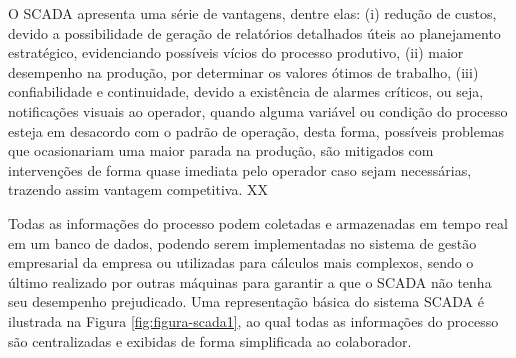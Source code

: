         O \gls{SCADA} apresenta uma série de vantagens, dentre elas: (i) redução de custos, devido a possibilidade de geração de relatórios detalhados úteis ao planejamento estratégico, evidenciando possíveis vícios do processo produtivo, (ii) maior desempenho na produção, por determinar os valores ótimos de trabalho, (iii) confiabilidade e continuidade, devido a existência de alarmes críticos, ou seja, notificações visuais ao operador, quando alguma variável ou condição do processo esteja em desacordo com o padrão de operação, desta forma, possíveis problemas que ocasionariam uma maior parada na produção, são mitigados com intervenções de forma quase imediata pelo operador caso sejam necessárias, trazendo assim vantagem competitiva. XX
        
        Todas as informações do processo podem coletadas e armazenadas em tempo real em um banco de dados, podendo serem implementadas no sistema de gestão empresarial da empresa ou utilizadas para cálculos mais complexos, sendo o último realizado por outras máquinas para garantir a que o \gls{SCADA} não tenha seu desempenho prejudicado.
        Uma representação básica do sistema \gls{SCADA} é ilustrada na Figura \ref{fig:figura-scada1}, ao qual todas as informações do processo são centralizadas e exibidas de forma simplificada ao colaborador. 
        
        \begin{figure}[!h]
	    \end{figure}
	    
